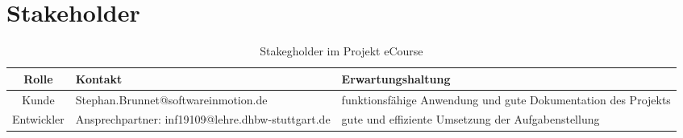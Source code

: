 \section{Stakeholder}

\begin{table}
\centering
\begin{tabularx}{\textwidth}[H]{|c|X|X|}
\hline
Rolle &	Kontakt & Erwartungshaltung\\
\hline
Kunde & Stephan.Brunnet@softwareinmotion.de & funktionsfähige Anwendung und gute Dokumentation des Projekts \\
\hline
Entwickler & Ansprechpartner: inf19109@lehre.dhbw-stuttgart.de & gute und effiziente Umsetzung der Aufgabenstellung\\
\hline
\end{tabularx}
\caption{Stakegholder im Projekt eCourse}
\label{tab:Stakeholder}
\end{table}

